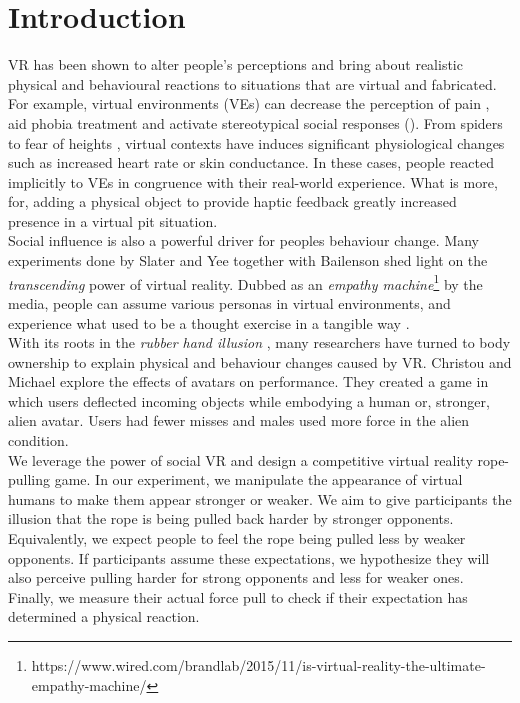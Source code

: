 \section{Introduction}
\label{section:intro}
VR has been shown to alter people's perceptions and bring about realistic physical and behavioural reactions to situations that are virtual and fabricated. For example, virtual environments (VEs) can decrease the perception of pain \cite{muhlberger2007pain}, aid phobia treatment \cite{parsons2008affective} and activate stereotypical social responses (\cite{dotsch2008virtual}). From spiders \cite{garcia2002virtual} to fear of heights \cite{meehan2002physiological}, virtual contexts have induces significant physiological changes such as increased heart rate or skin conductance. In these cases, people reacted implicitly to VEs in congruence with their real-world experience. What is more, for\cite{meehan2002physiological}, adding a physical object to provide haptic feedback greatly increased presence in a virtual pit situation. 
\\
Social influence is also a powerful driver for peoples behaviour change. Many experiments done by Slater \cite{slater2014transcending,slater2006virtual} and Yee together with Bailenson \cite{yee2009proteus} shed light on the \textit{transcending} power of virtual reality. Dubbed as an \textit{empathy machine}\footnote{https://www.wired.com/brandlab/2015/11/is-virtual-reality-the-ultimate-empathy-machine/} by the media, people can assume various personas in virtual environments, and experience what used to be a thought exercise in a tangible way \cite{shin2018empathy}.
\\
With its roots in the \textit{rubber hand illusion} \cite{botvinick1998rubber}, many researchers have turned to body ownership to explain physical and behaviour changes caused by VR. Christou and Michael explore the effects of avatars on performance. They created a game in which users deflected incoming objects while embodying a human or, stronger, alien avatar. Users had fewer misses and males used more force in the alien condition. 
\\
 We leverage the power of social VR and design a competitive virtual reality rope-pulling game. In our experiment, we manipulate the appearance of virtual humans to make them appear stronger or weaker.  We aim to give participants the illusion that the rope is being pulled back harder by stronger opponents. Equivalently, we expect people to feel the rope being pulled less by weaker opponents.  If participants assume these expectations, we hypothesize they will also perceive pulling harder for strong opponents and less for weaker ones. Finally, we measure their actual force pull to check if their expectation has determined a physical reaction. \\
